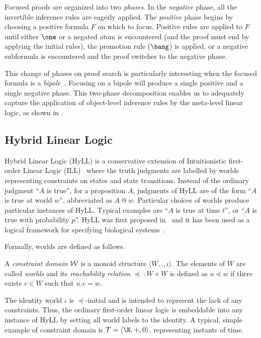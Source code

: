 \documentclass{llncs}
\begin{document}
Focused proofs are organized into two \emph{phases}.  In the \emph{negative} phase, all the invertible inference rules are eagerly applied. 
The \emph{positive} phase begins by choosing  a positive formula $F$ on which to focus. Positive rules are applied to $F$ until either $\one$ or a negated atom is encountered (and the proof must end by applying the initial rules),  
the promotion rule ($\bang$) is applied,  or a negative subformula is encountered and the proof switches to the negative phase.

This change of phases on proof search is particularly interesting when the 
focused formula is a {\em bipole}~\cite{DBLP:journals/logcom/Andreoli92}.
%
Focusing on a bipole will produce a
single positive and a single negative phase. This two-phase decomposition 
enables us to  adequately capture  the application of object-level inference 
rules by the meta-level linear logic, 
as shown in \cite{Despeyroux-Olarte-Pimentel:lsfa-16}.

% 
\subsection{Hybrid Linear Logic} \label{sec:hyll}
Hybrid Linear Logic  (HyLL)
is a conservative extension of Intuitionistic
first-order Linear Logic (ILL)~\cite{girard87tcs} where the truth judgments 
are labelled by worlds representing constraints on states and state transitions. 
Instead of the ordinary judgment ``$A$ is true'', for a proposition $A$,
judgments of HyLL are of the form 
``$A$ is true at world $w$'', abbreviated as $A ~@~ w$. 
Particular choices of worlds
produce particular instances of HyLL. 
Typical examples  are ``$A$ is true at time $t$'', 
or ``$A$ is true with probability $p$''.
%
HyLL was first proposed in~\cite{ChaudhuriDespeyroux:14} and it has  been used 
as a logical framework for specifying biological
systems~\cite{deMaria-Despeyroux-Felty:14-fmmb}.

Formally, worlds are defined as follows.
\begin{definition} \label{def:constraint-domain}
  A \emph{constraint domain} $\cal W$ is a monoid structure $\langle W, ., \iota\rangle$. 
  The elements of $W$ are called \emph{worlds}
  and its \emph{reachability relation}  $\preceq\ : W \times W$ is defined as  $u \preceq w$ if there exists 
  $v \in W$ such that $u . v = w$. 
\end{definition}
\noindent
The identity world $\iota$ is $\preceq$-initial and is intended to represent the
lack of any constraints. Thus, the ordinary first-order linear logic is embeddable into any 
instance of HyLL by setting all world labels to the identity.
A typical, simple example of constraint domain is 
$\mathcal{T} = \langle \N, +, 0\rangle$, representing instants of time. 
\end{document}
